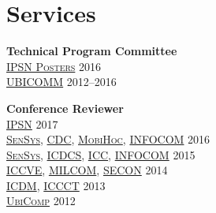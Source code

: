 
\section{\sc Services}
{\bf Technical Program Committee}\\
{\href{http://ipsn.acm.org/2016/posters.html}{\textsc{IPSN Posters}}} \hfill 2016\\
{\href{http://www.iaria.org/conferences2016/UBICOMM16.html}{\textsc{UBICOMM}}} \hfill 2012--2016\\
\vspace{-0.6cm}

{\bf Conference Reviewer}\\
{\href{http://ipsn.acm.org/2017/}{\textsc{IPSN}}} \hfill 2017\\
{\href{http://sensys.acm.org/2016/}{\textsc{SenSys}}}, {\href{http://cdc2016.ieeecss.org/}{\textsc{CDC}}}, {\href{http://www.sigmobile.org/mobihoc/2016/}{\textsc{MobiHoc}}}, {\href{http://infocom2016.ieee-infocom.org/}{\textsc{INFOCOM}}} \hfill 2016\\
{\href{http://sensys.acm.org/2015/}{\textsc{SenSys}}}, {\href{http://icdcs-2015.cse.ohio-state.edu/}{\textsc{ICDCS}}}, {\href{http://icc2015.ieee-icc.org/}{\textsc{ICC}}}, {\href{http://infocom2015.ieee-infocom.org/}{\textsc{INFOCOM}}} \hfill 2015\\
{\href{http://www.iccve.org/2014/}{\textsc{ICCVE}}}, {\href{http://www.milcom.org/2014/}{\textsc{MILCOM}}}, {\href{http://secon2014.ieee-secon.org}{\textsc{SECON}}} \hfill 2014\\
{\href{http://icdm2013.rutgers.edu}{\textsc{ICDM}}}, {\href{http://www.mnnit.ac.in/iccct2013}{\textsc{ICCCT}}} \hfill 2013\\
{\href{http://www.ubicomp.org/ubicomp2012}{\textsc{UbiComp}}} \hfill 2012\\
\vspace{-0.6cm}

